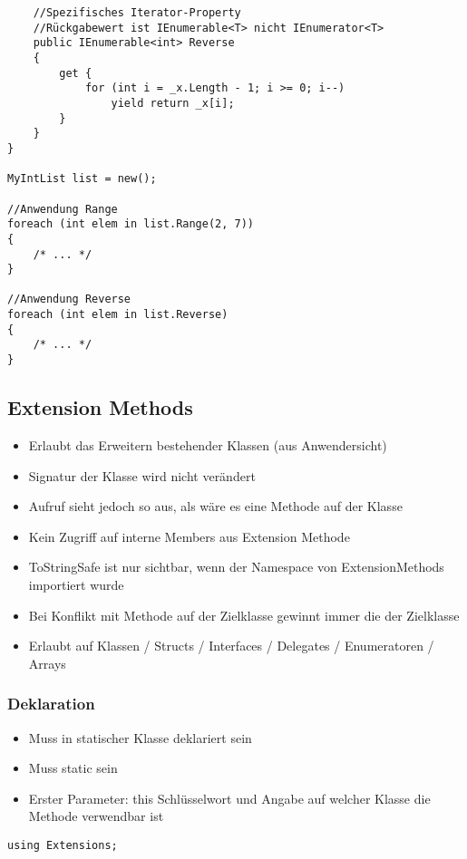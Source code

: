 \begin{multicols*}{2}
\begin{lstlisting}
    //Spezifisches Iterator-Property
    //Rückgabewert ist IEnumerable<T> nicht IEnumerator<T>
    public IEnumerable<int> Reverse 
    {
        get {
            for (int i = _x.Length - 1; i >= 0; i--)
                yield return _x[i];
        } 
    }
}

MyIntList list = new();

//Anwendung Range
foreach (int elem in list.Range(2, 7))
{
    /* ... */
}

//Anwendung Reverse
foreach (int elem in list.Reverse)
{
    /* ... */
}
\end{lstlisting}

\subsection{Extension Methods}
\begin{itemize}
    \item Erlaubt das Erweitern bestehender Klassen (aus Anwendersicht)
    \item Signatur der Klasse wird nicht verändert
    \item Aufruf sieht jedoch so aus, als wäre es eine Methode auf der Klasse
\end{itemize}
\begin{itemize}
    \item Kein Zugriff auf interne Members aus Extension Methode
    \item ToStringSafe ist nur sichtbar, wenn der Namespace von ExtensionMethods importiert wurde
    \item Bei Konflikt mit Methode auf der Zielklasse gewinnt immer die der Zielklasse
    \item Erlaubt auf Klassen / Structs / Interfaces / Delegates / Enumeratoren / Arrays
\end{itemize}
\subsubsection{Deklaration}
\begin{itemize}
    \item Muss in statischer Klasse deklariert sein
    \item Muss static sein
    \item Erster Parameter: this Schlüsselwort und Angabe auf welcher Klasse die Methode verwendbar ist
\end{itemize}
\begin{lstlisting}
using Extensions;


\end{lstlisting}
\end{multicols*}
